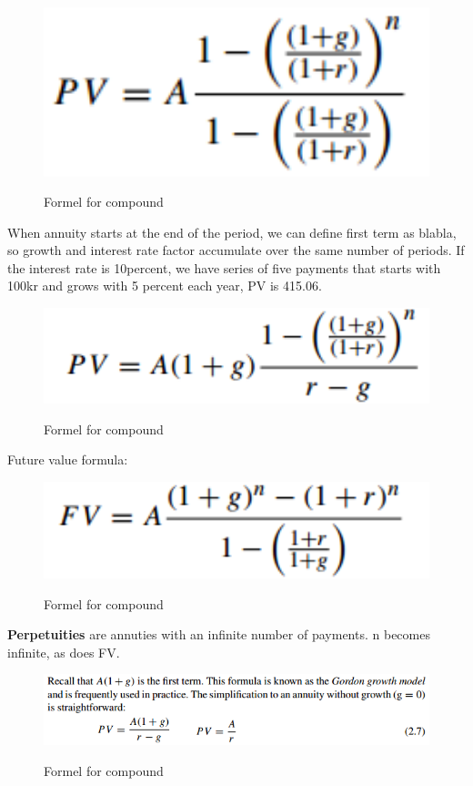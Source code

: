 \begin{figure}[ht!]
\centering
\includegraphics[width=120mm]{figures/formel1-8.png}
\label{fig:formel1-8}
\caption{Formel for compound}
\end{figure}

When annuity starts at the end of the period, we can define first term as blabla, so growth and interest rate factor accumulate over the same number of periods. If the interest rate is 10percent, we have series of five payments that starts with 100kr and grows with 5 percent each year, PV is 415.06.

\begin{figure}[ht!]
\centering
\includegraphics[width=120mm]{figures/formel1-9.png}
\label{fig:formel1-9}
\caption{Formel for compound}
\end{figure}

Future value formula: 

\begin{figure}[ht!]
\centering
\includegraphics[width=120mm]{figures/formel1-10.png}
\label{fig:formel1-10}
\caption{Formel for compound}
\end{figure}

\textbf{Perpetuities} are annuties with an infinite number of payments. n becomes infinite, as does FV. 

\begin{figure}[ht!]
\centering
\includegraphics[width=120mm]{figures/formel1-11.png}
\label{fig:formel1-11}
\caption{Formel for compound}
\end{figure}

